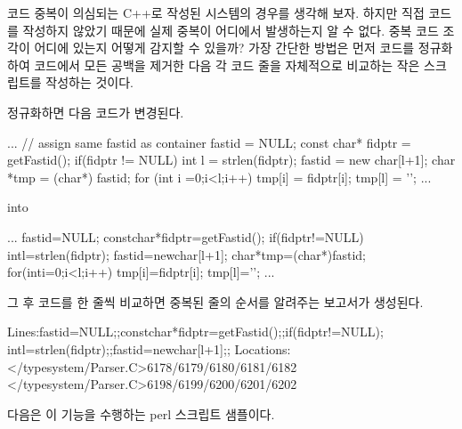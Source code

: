 \documentclass[a4paper,10pt,twoside]{book}
\begin{document}
코드 중복이 의심되는 C++로 작성된 시스템의 경우를 생각해 보자. 하지만 직접 코드를 작성하지 않았기 때문에 실제 중복이 어디에서 발생하는지 알 수 없다. 중복 코드 조각이 어디에 있는지 어떻게 감지할 수 있을까? 가장 간단한 방법은 먼저 코드를 정규화하여 코드에서 모든 공백을 제거한 다음 각 코드 줄을 자체적으로 비교하는 작은 스크립트를 작성하는 것이다.

정규화하면 다음 코드가 변경된다.

\begin{code}
...
// assign same fastid as container
fastid = NULL;
const char* fidptr = getFastid();
if(fidptr != NULL) {
	int l = strlen(fidptr);
	fastid = new char[l+1];
	char *tmp = (char*) fastid;
	for (int i =0;i<l;i++)
		tmp[i] = fidptr[i];
	tmp[l] = '\0';
}
...
\end{code}
into
\begin{code}
...
fastid=NULL;
constchar*fidptr=getFastid();
if(fidptr!=NULL)
intl=strlen(fidptr);
fastid=newchar[l+1];
char*tmp=(char*)fastid;
for(inti=0;i<l;i++)
tmp[i]=fidptr[i];
tmp[l]='\0';
...
\end{code}

그 후 코드를 한 줄씩 비교하면 중복된 줄의 순서를 알려주는 보고서가 생성된다.

\begin{code}
Lines:fastid=NULL;;constchar*fidptr=getFastid();;if(fidptr!=NULL);
intl=strlen(fidptr);;fastid=newchar[l+1];;
Locations:
</typesystem/Parser.C>6178/6179/6180/6181/6182
</typesystem/Parser.C>6198/6199/6200/6201/6202
\end{code}

다음은 이 기능을 수행하는 perl 스크립트 샘플이다.
\end{document}
